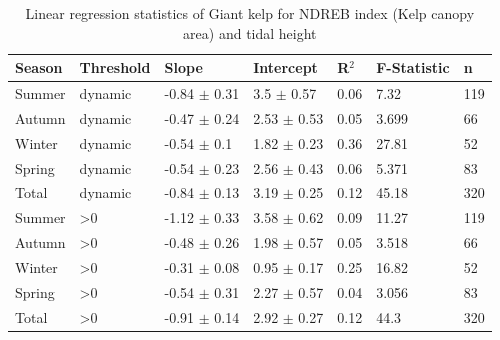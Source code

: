 \documentclass[a4paper,fleqn]{cas-sc}
\begin{document}
\begin{table}[width=.9\linewidth,cols=6,pos=h]
\caption{Linear regression statistics of Giant kelp for NDREB index (Kelp canopy area) and tidal height}\label{S4}
\small
\begin{tabular*}{\tblwidth}{@{} LLLLLLL@{} }
\toprule
Season & Threshold &Slope & Intercept & R$^{2}$ & F-Statistic & n\\
\midrule
Summer  & dynamic & -0.84 $\pm$ 0.31 & 3.5 $\pm$ 0.57 & 0.06 & 7.32 & 119 \\
Autumn  & dynamic & -0.47 $\pm$ 0.24 & 2.53 $\pm$ 0.53 & 0.05 & 3.699 & 66 \\
Winter  & dynamic & -0.54 $\pm$ 0.1 & 1.82 $\pm$ 0.23 & 0.36 & 27.81 & 52 \\
Spring  & dynamic & -0.54 $\pm$ 0.23 & 2.56 $\pm$ 0.43 & 0.06 & 5.371 & 83 \\
Total  & dynamic & -0.84 $\pm$ 0.13 & 3.19 $\pm$ 0.25 & 0.12 & 45.18 & 320 \\
Summer  & >0 & -1.12 $\pm$ 0.33 & 3.58 $\pm$ 0.62 & 0.09 & 11.27 & 119 \\
Autumn  & >0 & -0.48 $\pm$ 0.26 & 1.98 $\pm$ 0.57 & 0.05 & 3.518 & 66 \\
Winter  & >0 & -0.31 $\pm$ 0.08 & 0.95 $\pm$ 0.17 & 0.25 & 16.82 & 52 \\
Spring  & >0 & -0.54 $\pm$ 0.31 & 2.27 $\pm$ 0.57 & 0.04 & 3.056 & 83 \\
Total  & >0 & -0.91 $\pm$ 0.14 & 2.92 $\pm$ 0.27 & 0.12 & 44.3 & 320 \\
\bottomrule
\end{tabular*}
\label{Fig:NDREBTidal}
\end{table}
\FloatBarrier
\end{document}
